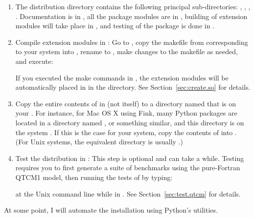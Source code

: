 \begin{enumerate}
\item The  distribution directory 
	\fn{}contains the following 
	principal sub-directories:
	, , , .
	Documentation is in ,
	all the package modules are in ,
	building of extension modules will take place in ,
	and testing of the package is done in .

\item Compile  extension modules in :
	Go to , copy the makefile from
	 corresponding to your
	system into , rename to ,
	make changes to the makefile as needed,
	and execute:
	\begin{codeblock}
	\end{codeblock}
	If you executed the make commands in \fn{src,},
	the extension modules will be automatically placed in
	 in the \fn{}directory.
	See Section~\ref{sec:create.so} for details.
	\label{list:compile.so.sum}

\item Copy the entire contents of  in
	\fn{}(not  itself) 
	to a directory named
	 that is on your .  For instance,
	for Mac OS X using Fink,
	many Python packages are located in a directory
	named , or something
	similar, and this directory is on the system .  
	If this is the case for your system, copy the
	contents of  into
	\fn{/sw/lib/\-python2.4/\-site-packages/\-qtcm}.
	(For Unix systems, the equivalent directory is usually
	.)

\item Test the  distribution in :
	This step is optional and can take a while.
	Testing requires you to first generate a suite of benchmarks
	using the pure-Fortran QTCM1 model, then running the tests of
	 by typing:
	\begin{codeblock}
	\end{codeblock}
	at the Unix command line while in .
	See Section~\ref{sec:test.qtcm} for details.

\end{enumerate}

At some point, I will automate the installation using Python's
utilities.



